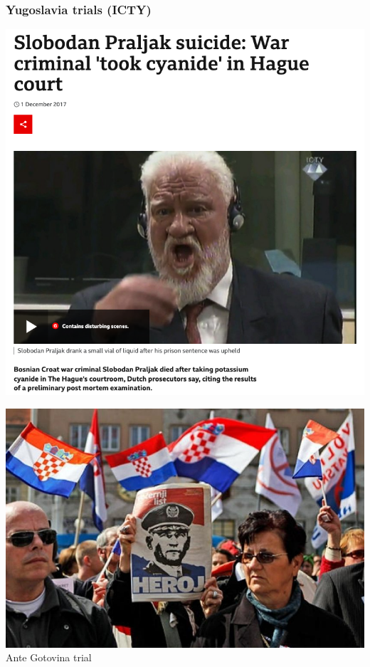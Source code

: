 \documentclass[aspectratio=43]{beamer}
\begin{document}
\begin{frame}
\frametitle{Yugoslavia trials (ICTY)}
\centering

\begin{minipage}{.49\textwidth}\centering
\includegraphics[width = \textwidth]{img/praljak}
\end{minipage}\hfill
\begin{minipage}{.49\textwidth}\centering
\includegraphics[width = \textwidth]{img/gotovina}\\{\small Ante Gotovina trial}
\end{minipage}

\end{frame}
\end{document}
